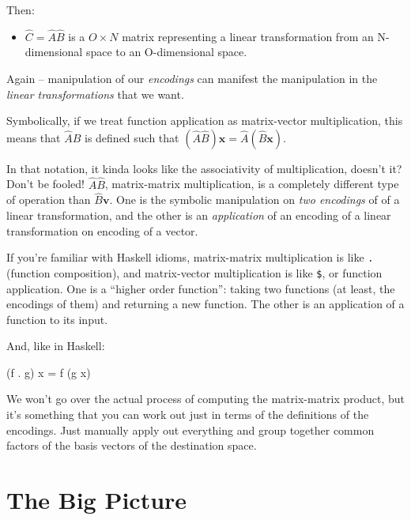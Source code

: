 \documentclass[]{article}
\newenvironment{Shaded}{}{}
\newcommand{\NormalTok}[1]{#1}
\newcommand{\OperatorTok}[1]{\textcolor[rgb]{0.40,0.40,0.40}{#1}}
\newcommand{\OtherTok}[1]{\textcolor[rgb]{0.00,0.44,0.13}{#1}}
\begin{document}
Then:

\begin{itemize}
\tightlist
\item
  \(\hat{C} = \hat{A}\hat{B}\) is a \(O \times N\) matrix representing a linear
  transformation from an N-dimensional space to an O-dimensional space.
\end{itemize}

Again -- manipulation of our \emph{encodings} can manifest the manipulation in
the \emph{linear transformations} that we want.

Symbolically, if we treat function application as matrix-vector multiplication,
this means that \(\hat{A}\hat{B}\) is defined such that
\((\hat{A}\hat{B})\mathbf{x} = \hat{A}(\hat{B}\mathbf{x})\).

In that notation, it kinda looks like the associativity of multiplication,
doesn't it? Don't be fooled! \(\hat{A} \hat{B}\), matrix-matrix multiplication,
is a completely different type of operation than \(\hat{B}\mathbf{v}\). One is
the symbolic manipulation on \emph{two encodings} of of a linear transformation,
and the other is an \emph{application} of an encoding of a linear transformation
on encoding of a vector.

If you're familiar with Haskell idioms, matrix-matrix multiplication is like
\texttt{.} (function composition), and matrix-vector multiplication is like
\texttt{\$}, or function application. One is a ``higher order function'': taking
two functions (at least, the encodings of them) and returning a new function.
The other is an application of a function to its input.

And, like in Haskell:

\begin{Shaded}
\begin{Highlighting}[]
\NormalTok{(f }\OperatorTok{.}\NormalTok{ g) x }\OtherTok{=}\NormalTok{ f (g x)}
\end{Highlighting}
\end{Shaded}

We won't go over the actual process of computing the matrix-matrix product, but
it's something that you can work out just in terms of the definitions of the
encodings. Just manually apply out everything and group together common factors
of the basis vectors of the destination space.

\hypertarget{the-big-picture}{%
\section{The Big Picture}\label{the-big-picture}}
\end{document}
